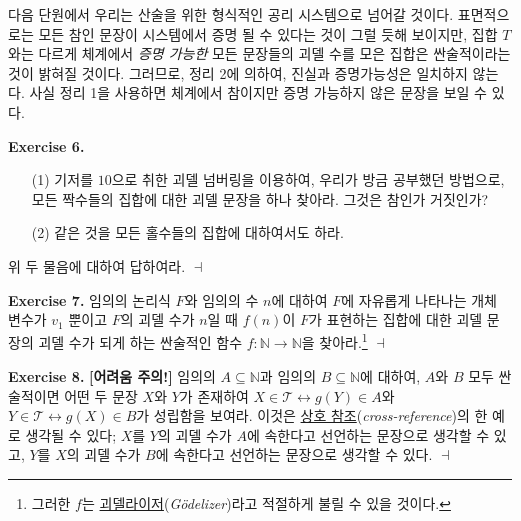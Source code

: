 \documentclass[12pt]{paper}
\newenvironment{context}[1][]{\noindent \textbf{{#1}.}}{\hfill $ \dashv $}
\begin{document}
  다음 단원에서 우리는 산술을 위한 형식적인 공리 시스템으로 넘어갈 것이다.
  표면적으로는 모든 참인 문장이 시스템에서 증명 될 수 있다는 것이 그럴 듯해 보이지만,
  집합 $T$와는 다르게 체계에서 \textit{증명 가능한} 모든 문장들의 괴델 수를 모은 집합은 싼술적이라는 것이 밝혀질 것이다.
  그러므로, 정리 2에 의하여, 진실과 증명가능성은 일치하지 않는다.
  사실 정리 1을 사용하면 체계에서 참이지만 증명 가능하지 않은 문장을 보일 수 있다.

  \begin{context}[Exercise 6]
    \begin{enumerate}
      \item[(1)] 기저를 $10$으로 취한 괴델 넘버링을 이용하여, 우리가 방금 공부했던 방법으로, 모든 짝수들의 집합에 대한 괴델 문장을 하나 찾아라.
      그것은 참인가 거짓인가?
      \item[(2)] 같은 것을 모든 홀수들의 집합에 대하여서도 하라.
    \end{enumerate}
    
    위 두 물음에 대하여 답하여라.
  \end{context}

  \begin{context}[Exercise 7]
    임의의 논리식 $F$와 임의의 수 $n$에 대하여 $F$에 자유롭게 나타나는 개체 변수가 $v_1$ 뿐이고 $F$의 괴델 수가 $n$일 때 $f \left( n \right)$이 $F$가 표현하는 집합에 대한 괴델 문장의 괴델 수가 되게 하는 싼술적인 함수 $f : \mathbb{N} \to \mathbb{N}$을 찾아라.\footnote
    {
      그러한 $f$는 \underline{괴델라이저}(\textit{G\"odelizer})라고 적절하게 불릴 수 있을 것이다.
    }
  \end{context}

  \begin{context}[Exercise 8]
    \textbf{[어려움 주의!]} 임의의 $A \subseteq \mathbb{N}$과 임의의 $B \subseteq \mathbb{N}$에 대하여,
    $A$와 $B$ 모두 싼술적이면 어떤 두 문장 $X$와 $Y$가 존재하여 $X \in \mathcal{T} \leftrightarrow g \left( Y \right) \in A$와 $Y \in \mathcal{T} \leftrightarrow g \left( X \right) \in B$가 성립함을 보여라.
    이것은 \underline{상호 참조}(\textit{cross-reference})의 한 예로 생각될 수 있다;
    $X$를 $Y$의 괴델 수가 $A$에 속한다고 선언하는 문장으로 생각할 수 있고,
    $Y$를 $X$의 괴델 수가 $B$에 속한다고 선언하는 문장으로 생각할 수 있다.
  \end{context}
\end{document}
